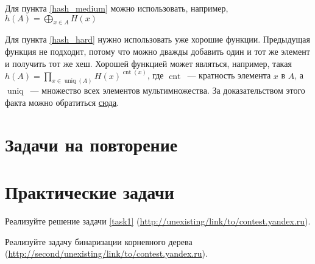 \documentclass[addpoints]{exam}
\DeclareMathOperator{\uniq}{uniq}
\DeclareMathOperator{\cnt}{cnt}
\begin{document}
\begin{questions}
\begin{solution}
Для пункта \ref{hash_medium} можно использовать, например, $h(A) = \bigoplus\limits_{x \in A} H(x)$

Для пункта \ref{hash_hard} нужно использовать уже хорошие функции. Предыдущая функция не подходит, потому что можно дважды добавить один и тот же элемент и получить тот же хеш. Хорошей функцией может являться, например, такая $h(A) = \prod\limits_{x \in \uniq(A)} H(x)^{\cnt(x)}$, где $\cnt$~--- кратность элемента $x$ в $A$, а $\uniq$~--- множество всех элементов мультимножества. За доказательством этого факта можно обратиться \href{http://link.springer.com/chapter/10.1007%2F978-3-540-40061-5_12}{сюда}.

\end{solution}

\section{Задачи на повторение}



\section{Практические задачи}

\question[1] Реализуйте решение задачи \ref{task1} (\url{http://unexisting/link/to/contest.yandex.ru}).

\question[1] Реализуйте задачу бинаризации корневного дерева
(\url{http://second/unexisting/link/to/contest.yandex.ru}).

\end{questions}


\begin{center}
\pointtable[h][questions]
\end{center}
\end{document}
